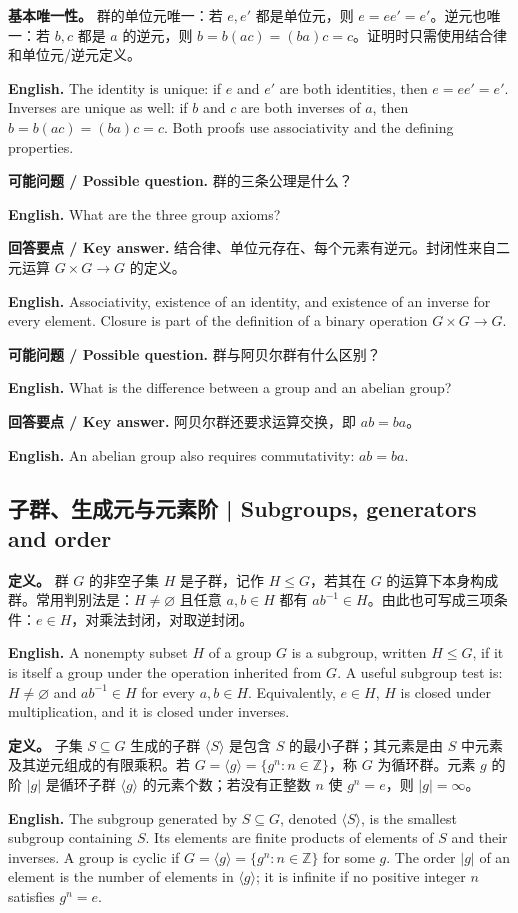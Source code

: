 \documentclass[UTF8,11pt,a4paper]{ctexart}
\newcommand{\EN}[1]{\par\noindent\textbf{English.} #1\par}
\newcommand{\ASK}[4]{\par\noindent\textbf{可能问题 / Possible question.} #1\par\EN{#2}\noindent\textbf{回答要点 / Key answer.} #3\par\EN{#4}\medskip}
\begin{document}
\noindent\textbf{基本唯一性。} 群的单位元唯一：若 $e,e'$ 都是单位元，则 $e=ee'=e'$。逆元也唯一：若 $b,c$ 都是 $a$ 的逆元，则 $b=b(ac)=(ba)c=c$。证明时只需使用结合律和单位元/逆元定义。
\EN{The identity is unique: if $e$ and $e'$ are both identities, then $e=ee'=e'$. Inverses are unique as well: if $b$ and $c$ are both inverses of $a$, then $b=b(ac)=(ba)c=c$. Both proofs use associativity and the defining properties.}

\ASK{群的三条公理是什么？}{What are the three group axioms?}{结合律、单位元存在、每个元素有逆元。封闭性来自二元运算 $G\times G\to G$ 的定义。}{Associativity, existence of an identity, and existence of an inverse for every element. Closure is part of the definition of a binary operation $G\times G\to G$.}

\ASK{群与阿贝尔群有什么区别？}{What is the difference between a group and an abelian group?}{阿贝尔群还要求运算交换，即 $ab=ba$。}{An abelian group also requires commutativity: $ab=ba$.}

\subsection{子群、生成元与元素阶 | Subgroups, generators and order}
\noindent\textbf{定义。} 群 $G$ 的非空子集 $H$ 是子群，记作 $H\le G$，若其在 $G$ 的运算下本身构成群。常用判别法是：$H\ne\varnothing$ 且任意 $a,b\in H$ 都有 $ab^{-1}\in H$。由此也可写成三项条件：$e\in H$，对乘法封闭，对取逆封闭。

\EN{A nonempty subset $H$ of a group $G$ is a subgroup, written $H\le G$, if it is itself a group under the operation inherited from $G$. A useful subgroup test is: $H\ne\varnothing$ and $ab^{-1}\in H$ for every $a,b\in H$. Equivalently, $e\in H$, $H$ is closed under multiplication, and it is closed under inverses.}

\noindent\textbf{定义。} 子集 $S\subseteq G$ 生成的子群 $\langle S\rangle$ 是包含 $S$ 的最小子群；其元素是由 $S$ 中元素及其逆元组成的有限乘积。若 $G=\langle g\rangle=\{g^n:n\in\mathbb Z\}$，称 $G$ 为循环群。元素 $g$ 的阶 $|g|$ 是循环子群 $\langle g\rangle$ 的元素个数；若没有正整数 $n$ 使 $g^n=e$，则 $|g|=\infty$。

\EN{The subgroup generated by $S\subseteq G$, denoted $\langle S\rangle$, is the smallest subgroup containing $S$. Its elements are finite products of elements of $S$ and their inverses. A group is cyclic if $G=\langle g\rangle=\{g^n:n\in\mathbb Z\}$ for some $g$. The order $|g|$ of an element is the number of elements in $\langle g\rangle$; it is infinite if no positive integer $n$ satisfies $g^n=e$.}
\end{document}
